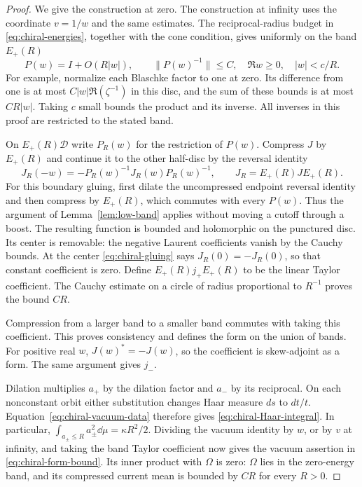 \begin{proof}
We give the construction at zero. The construction at infinity uses the
coordinate $v=1/w$ and the same estimates. The reciprocal-radius budget
in \eqref{eq:chiral-energies}, together with the cone condition, gives
uniformly on the band $E_+(R)$
\begin{equation}\label{eq:chiral-disc-inverse}
 P(w)=I+O(R|w|),\qquad \|P(w)^{-1}\|\le C,
                  \quad \Re w\ge0,\quad |w|<c/R.
\end{equation}
For example, normalize each Blaschke factor to one at zero. Its difference
from one is at most $C|w|\Re(\zeta^{-1})$ in this disc, and the sum of
these bounds is at most $CR|w|$. Taking $c$ small bounds the product and
its inverse. All inverses in this proof are restricted to the stated band.

On $E_+(R)\mathcal D$ write $P_R(w)$ for the restriction of $P(w)$.
Compress $J$ by $E_+(R)$ and continue it to the other half-disc by the
reversal identity
\begin{equation}\label{eq:chiral-gluing}
 J_R(-w)=-P_R(w)^{-1}J_R(w)P_R(w)^{-1},
       \qquad J_R=E_+(R)JE_+(R).
\end{equation}
For this boundary gluing, first dilate the uncompressed endpoint reversal
identity and then compress by $E_+(R)$, which commutes with every $P(w)$.
Thus the argument of Lemma~\ref{lem:low-band} applies without moving a
cutoff through a boost. The resulting
function is bounded and holomorphic on the punctured disc. Its center is
removable: the negative Laurent coefficients vanish by the Cauchy bounds.
At the center \eqref{eq:chiral-gluing} says $J_R(0)=-J_R(0)$, so that
constant coefficient is zero. Define $E_+(R)j_+E_+(R)$ to be the linear
Taylor coefficient. The Cauchy estimate on a circle of radius proportional
to $R^{-1}$ proves the bound $CR$.

Compression from a larger band to a smaller band commutes with taking
this coefficient. This proves consistency and defines the form on the
union of bands. For positive real $w$, $J(w)^*=-J(w)$, so the coefficient
is skew-adjoint as a form. The same argument gives $j_-$.

Dilation multiplies $a_+$ by the dilation factor and $a_-$ by its
reciprocal. On each nonconstant orbit either substitution changes Haar
measure $ds$ to $dt/t$. Equation~\eqref{eq:chiral-vacuum-data} therefore
gives \eqref{eq:chiral-Haar-integral}. In particular,
$\int_{a_\pm\le R}a_\pm^2\dd\mu=\kappa R^2/2$.
Dividing the vacuum identity by $w$, or by $v$ at infinity, and taking
the band Taylor coefficient now gives the vacuum assertion in
\eqref{eq:chiral-form-bound}. Its inner product with $\Omega$ is zero:
$\Omega$ lies in the zero-energy band, and its compressed current mean
is bounded by $CR$ for every $R>0$.


\end{proof}
